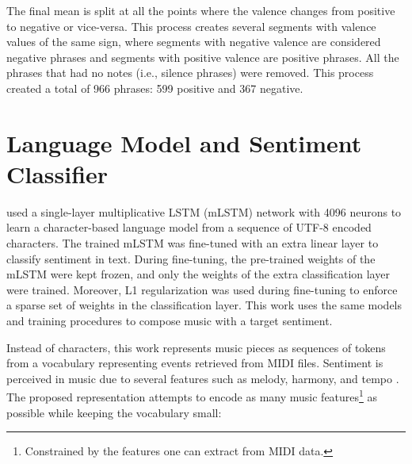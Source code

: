 
 The final mean is split at all the points where the valence changes from positive to negative or vice-versa. This process creates several segments with valence values of the same sign, where segments with negative valence are considered negative phrases and segments with positive valence are positive phrases.  All the phrases that had no notes (i.e., silence phrases) were removed. This process created a total of 966 phrases: 599 positive and 367 negative.

\section{Language Model and Sentiment Classifier}
\label{sec:model}

\citet{radford_2017} used a single-layer multiplicative LSTM (mLSTM) network \cite{krause2017} with 4096 neurons to learn a character-based language model from a sequence of UTF-8 encoded characters. The trained mLSTM was fine-tuned with an extra linear layer to classify sentiment in text. During fine-tuning, the pre-trained weights of the mLSTM were kept frozen, and only the weights of the extra classification layer were trained. Moreover, L1 regularization was used during fine-tuning to enforce a sparse set of weights in the classification layer. This work uses the same models and training procedures to compose music with a target sentiment.

Instead of characters, this work represents music pieces as sequences of tokens from a vocabulary representing events retrieved from MIDI files. Sentiment is perceived in music due to several features such as melody, harmony, and tempo \cite{kim2010music}. The proposed representation attempts to encode as many music features\footnote{Constrained by the features one can extract from MIDI data.} as possible while keeping the vocabulary small:

